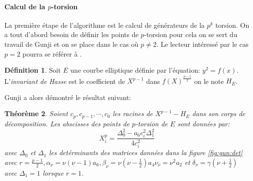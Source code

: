 \documentclass[10pt,a4paper]{book}
\theoremstyle{plain}
\newtheorem{thm}{Théorème}[chapter]
\theoremstyle{definition}
\theoremstyle{definition}
\theoremstyle{definition}
\theoremstyle{definition}
\newtheorem{defi}[thm]{Définition}
\theoremstyle{remark}
\theoremstyle{remark}
\theoremstyle{definition}
\begin{document}
\paragraph{Calcul de la $p$-torsion}
La première étape de l'algorithme est le calcul de générateurs de la $p^k$ torsion. On a tout d'abord besoin de définir les points de $p$-torsion pour cela on se sert du travail de Gunji \cite{Gunji76} et on se place dans le cas où $p \neq 2$. Le lecteur intéressé par le cas $p=2$ pourra se référer à \cite[3.2]{DeFeo11}.

\begin{defi}
Soit $E$ une courbe elliptique définie par l'équation: $y^2=f(x)$. L'\emph{invariant de Hasse} est le coefficient de $X^{p-1}$ dans $f(X)^{\frac{p-1}{2}}$ on le note $H_{E}$.
\end{defi}

Gunji a alors démontré le résultat suivant:

\begin{thm}
\label{thm:Gunji}
Soient $c_p, c_{p-1}, \cdots, c_{0}$ les racines de $X^{p-1}-H_{E}$ dans son corps de décomposition. Les abscisses des points de $p$-torsion de $E$ sont données par: 
\begin{equation*}
X^{p}_i=\frac{\Delta_0^2-a_6c_i^2\Delta_1^2}{4c_i^2}
\end{equation*}
avec $\Delta_0$ et $\Delta_1$ les detérminants des matrices données dans la figure \ref{fig:gun:det} avec $r=\frac{p-1}{2}, \alpha_{\nu}=\nu (\nu -1 ) a_6, \beta_{\nu}=\nu(\nu-\frac{1}{2})a_4 \nu_{\nu}=\nu^2a_2$ et $\delta_{\nu}=\gamma(\nu + \frac{1}{2})$ avec $\Delta_1=1$ lorsque $r=1$.
\end{thm}
\end{document}
